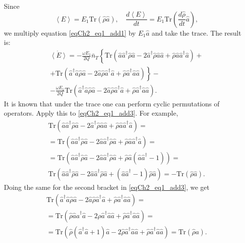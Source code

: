 Since 
\begin{equation}
\left<E\right> = E_1 \mathrm{Tr}\left(\hat{\rho}\hat{a}\right), \quad
\frac{d \left<E\right>}{d t} = E_1 \mathrm{Tr}\left(\frac{d \hat{\rho}}{dt}\hat{a}\right),
\label{eqCh2_eq1_add2}
\end{equation}
we multiply equation \eqref{eqCh2_eq1_add1} by $E_1 \hat{a}$ and take the trace. The result is:
\begin{eqnarray}
\dot{\left<E\right>} =
- \frac{\omega E_1}{2Q}\bar{n}_T
\left\{\mathrm{Tr}\left(\hat{a}\hat{a}^{\dag}\hat{\rho}\hat{a} - 
2 \hat{a}^{\dag}\hat{\rho}\hat{a}\hat{a} +
\hat{\rho}\hat{a}\hat{a}^{\dag}\hat{a}\right) + 
\right.
\nonumber \\
+\left.
\mathrm{Tr}\left(\hat{a}^{\dag}\hat{a}\hat{\rho}\hat{a} - 
2 \hat{a}\hat{\rho}\hat{a}^{\dag}\hat{a}
+ \hat{\rho}\hat{a}^{\dag}\hat{a}\hat{a}
\right)
\right\}
- 
\nonumber \\
- \frac{\omega E_1}{2Q}
\mathrm{Tr}\left(\hat{a}^{\dag}\hat{a}\hat{\rho}\hat{a} - 
2 \hat{a}\hat{\rho}\hat{a}^{\dag}\hat{a}
+ \hat{\rho}\hat{a}^{\dag}\hat{a}\hat{a}
\right).
\label{eqCh2_eq1_add3}
\end{eqnarray}
It is known that under the trace one can perform cyclic permutations
of operators. Apply this to \eqref{eqCh2_eq1_add3}.
For example,
\begin{eqnarray}
\mathrm{Tr}\left(\hat{a}\hat{a}^{\dag}\hat{\rho}\hat{a} - 
2 \hat{a}^{\dag}\hat{\rho}\hat{a}\hat{a} +
\hat{\rho}\hat{a}\hat{a}^{\dag}\hat{a}\right) = 
\nonumber \\
= \mathrm{Tr}\left(\hat{a}\hat{a}^{\dag}\hat{\rho}\hat{a} - 
2 \hat{a}\hat{a}^{\dag}\hat{\rho}\hat{a} +
\hat{\rho}\hat{a}\hat{a}^{\dag}\hat{a}\right) = 
\nonumber \\
= \mathrm{Tr}\left(\hat{a}\hat{a}^{\dag}\hat{\rho}\hat{a} - 
2 \hat{a}\hat{a}^{\dag}\hat{\rho}\hat{a} +
\hat{\rho}\hat{a}\left(\hat{a}\hat{a}^{\dag} - 1\right)\right) = 
\nonumber \\
\mathrm{Tr}\left(\hat{a}\hat{a}^{\dag}\hat{\rho}\hat{a} - 
2 \hat{a}\hat{a}^{\dag}\hat{\rho}\hat{a} +
\left(\hat{a}\hat{a}^{\dag} - 1\right)\hat{\rho}\hat{a}\right) = 
- \mathrm{Tr}\left(\hat{\rho}\hat{a}\right).
\label{eqCh2_eq1_add4}
\end{eqnarray}
Doing the same for the second bracket in \eqref{eqCh2_eq1_add3}, we get
\begin{eqnarray}
\mathrm{Tr}\left(\hat{a}^{\dag}\hat{a}\hat{\rho}\hat{a} - 
2 \hat{a}\hat{\rho}\hat{a}^{\dag}\hat{a}
+ \hat{\rho}\hat{a}^{\dag}\hat{a}\hat{a} \right) = 
\nonumber \\
= 
\mathrm{Tr}\left(\hat{\rho}\hat{a}\hat{a}^{\dag}\hat{a} - 
2 \hat{\rho}\hat{a}^{\dag}\hat{a}\hat{a}
+ \hat{\rho}\hat{a}^{\dag}\hat{a}\hat{a} \right) = 
\nonumber \\
= 
\mathrm{Tr}\left(\hat{\rho}\left(\hat{a}^{\dag}\hat{a} + 1\right)\hat{a} - 
2 \hat{\rho}\hat{a}^{\dag}\hat{a}\hat{a}
+ \hat{\rho}\hat{a}^{\dag}\hat{a}\hat{a} \right) = 
\mathrm{Tr}\left(\hat{\rho}\hat{a}\right).
\label{eqCh2_eq1_add5}
\end{eqnarray}
